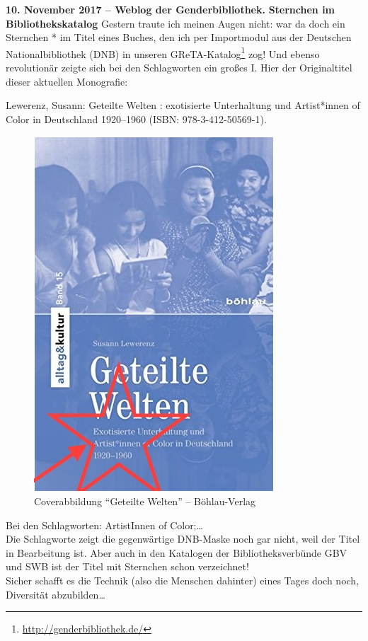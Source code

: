 \documentclass[a4paper,
fontsize=11pt,
oneside,
numbers=noperiodatend,
parskip=half-,
bibliography=totoc,
final
]{scrartcl}
\begin{document}
\textbf{10. November 2017 -- Weblog der Genderbibliothek.}
\textbf{Sternchen im Bibliothekskatalog} Gestern traute ich meinen Augen
nicht: war da doch ein Sternchen * im Titel eines Buches, den ich per
Importmodul aus der Deutschen Nationalbibliothek (DNB) in unseren
GReTA-Katalog\footnote{\url{http://genderbibliothek.de/}} zog! Und
ebenso revolutionär zeigte sich bei den Schlagworten ein großes I. Hier
der Originaltitel dieser aktuellen Monografie:

Lewerenz, Susann: Geteilte Welten : exotisierte Unterhaltung und
Artist*innen of Color in Deutschland 1920--1960 (ISBN:
978-3-412-50569-1).

\begin{figure}
\centering
\includegraphics{img/Aleksander_1.jpg}
\caption{Coverabbildung \enquote{Geteilte Welten} -- Böhlau-Verlag}
\end{figure}

Bei den Schlagworten: ArtistInnen of Color;\ldots{}\\
Die Schlagworte zeigt die gegenwärtige DNB-Maske noch gar nicht, weil
der Titel in Bearbeitung ist. Aber auch in den Katalogen der
Bibliotheksverbünde GBV und SWB ist der Titel mit Sternchen schon
verzeichnet!\\
Sicher schafft es die Technik (also die Menschen dahinter) eines Tages
doch noch, Diversität abzubilden\ldots{}\\
\end{document}
